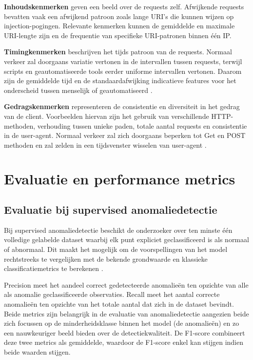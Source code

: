 \textbf{Inhoudskenmerken} geven een beeld over de requests zelf. Afwijkende requests bevatten vaak een afwijkend patroon zoals lange URI's die kunnen wijzen op injection-pogingen. Relevante kenmerken kunnen de gemiddelde en maximale URI-lengte zijn en de frequentie van specifieke URI-patronen binnen één IP\autocite{Chua2024}. 

\textbf{Timingkenmerken} beschrijven het tijds patroon van de requests. Normaal verkeer zal doorgaans variatie vertonen in de intervallen tussen requests, terwijl scripts en geautomatiseerde tools eerder uniforme intervallen vertonen. Daarom zijn de gemiddelde tijd en de standaardafwijking indicatieve features voor het onderscheid tussen menselijk of geautomatiseerd \autocite{Schummer2024, Benova2024}. 

\textbf{Gedragskenmerken} representeren de consistentie en diversiteit in het gedrag van de client. Voorbeelden hiervan zijn het gebruik van verschillende HTTP-methoden, verhouding tussen unieke paden, totale aantal requests en consistentie in de user-agent. Normaal verkeer zal zich doorgaans beperken tot Get en POST methoden en zal zelden in een tijdsvenster wisselen van user-agent \autocite{Benova2024, Chua2024}.  

\section{Evaluatie en performance metrics}
\label{sec:ML-methoden-anomalie}
\subsection{Evaluatie bij supervised anomaliedetectie}
\label{subsec:toegevoegde-waarde-ML}
Bij supervised anomaliedetectie beschikt de onderzoeker over ten minste één volledige gelabelde dataset waarbij elk punt expliciet geclassificeerd is als normaal of abnormaal. Dit maakt het mogelijk om de voorspellingen van het model rechtstreeks te vergelijken met de bekende grondwaarde en klassieke classificatiemetrics te berekenen \autocite{Goldstein2016}.

Precision meet het aandeel correct gedetecteerde anomalieën ten opzichte van alle als anomalie geclassificeerde observaties. Recall meet het aantal correcte anomalieën ten opzichte van het totale aantal dat zich in de dataset bevindt. Beide metrics zijn belangrijk in de evaluatie van anomaliedetectie aangezien beide zich focussen op de minderheidsklasse binnen het model (de anomalieën) en zo een nauwkeuriger beeld bieden over de detectiekwaliteit. De F1-score combineert deze twee metrics als gemiddelde, waardoor de F1-score enkel kan stijgen indien beide waarden stijgen\autocite{Chadha2020}.  


